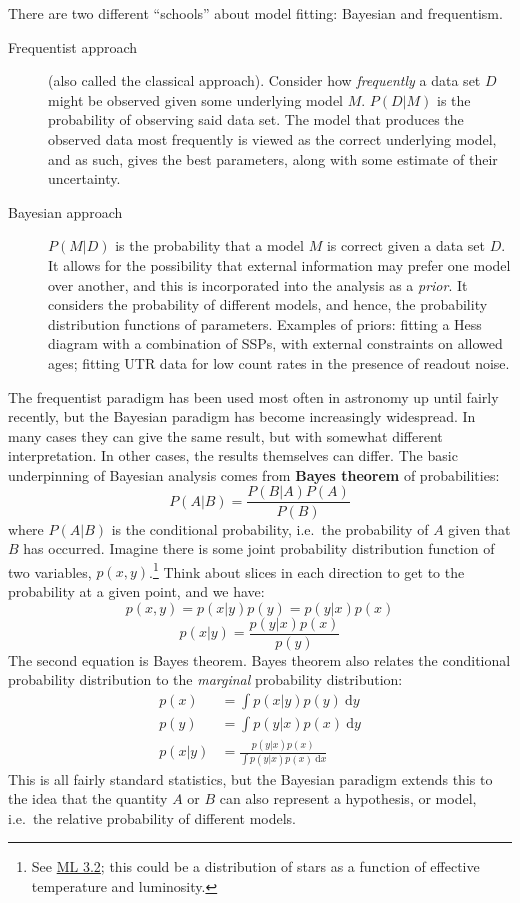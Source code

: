 \documentclass{article}
\begin{document}
There are two different ``schools'' about model fitting: Bayesian and
frequentism.
\begin{description}
    \item [Frequentist approach]
        (also called the classical approach). Consider how \emph{frequently} a
        data set $D$ might be observed given some underlying model $M$.
        \textbf{$P(D|M)$} is the probability of observing said data set. The
        model that produces the observed data most frequently is viewed as the
        correct underlying model, and as such, gives the best parameters, along
        with some estimate of their uncertainty.
    \item [Bayesian approach]
        \textbf{$P(M|D)$} is the probability that a model $M$ is correct given
        a data set $D$. It allows for the possibility that external information
        may prefer one model over another, and this is incorporated into the
        analysis as a \textit{prior}. It considers the probability of different
        models, and hence, the probability distribution functions of
        parameters. Examples of priors: fitting a Hess diagram with a
        combination of SSPs, with external constraints on allowed ages; fitting
        UTR data for low count rates in the presence of readout noise.
\end{description}
The frequentist paradigm has been used most often in astronomy up until fairly
recently, but the Bayesian paradigm has become increasingly widespread. In
many cases they can give the same result, but with somewhat different
interpretation. In other cases, the results themselves can differ.
The basic underpinning of
Bayesian analysis comes from \textbf{Bayes theorem} of probabilities:
\[
    P(A|B) = \frac{P(B|A)P(A)}{P(B)}
    \]
where $P(A|B)$ is the conditional probability, i.e.\ the probability of $A$ given
that $B$ has occurred. Imagine there is some joint probability distribution
function of two variables, $p(x,y)$.\footnote{
    See \href{http://astronomy.nmsu.edu/holtz/a575/images/ML3.2.png}
    {ML 3.2}; this could be a distribution
    of stars as a function of effective temperature and luminosity.
}
Think about slices in each direction to get to the probability at a given
point, and we have:
\[
    p(x,y) = p(x|y)p(y) = p(y|x)p(x)
    \]
\[
    p(x|y) = \frac{p(y|x)p(x)}{p(y)}
    \]
The second equation is Bayes theorem. Bayes theorem also relates the
conditional probability distribution to the \textit{marginal} probability
distribution:
\begin{align*}
    p(x) &= \int{\! p(x|y)p(y) \ \mathrm{d}y }\\
    p(y) &= \int{\! p(y|x)p(x) \ \mathrm{d}y }\\
    p(x|y) &= \frac{p(y|x)p(x)}{\int{\! p(y|x)p(x) \ \mathrm{d}x} }
\end{align*}
This is all fairly standard statistics, but the Bayesian paradigm extends
this to the idea that the quantity $A$ or $B$ can also represent a hypothesis,
or model, i.e.\ the relative probability of different models.
\end{document}
